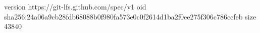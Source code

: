 version https://git-lfs.github.com/spec/v1
oid sha256:24a06a9cb28fdb68088b0f980fa573e0c0f2614d1ba2f0ee275f306c786ccfeb
size 43840
